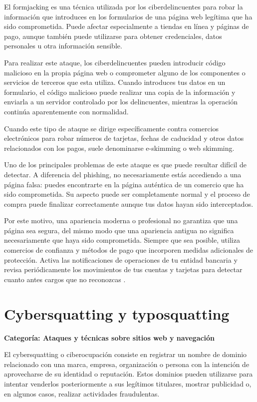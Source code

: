 \documentclass[
  spanish,
  a4paper,
  openany]{book}
\begin{document}
El formjacking es una técnica utilizada por los ciberdelincuentes para robar la información que introduces en los formularios de una página web legítima que ha sido comprometida. Puede afectar especialmente a tiendas en línea y páginas de pago, aunque también puede utilizarse para obtener credenciales, datos personales u otra información sensible.

Para realizar este ataque, los ciberdelincuentes pueden introducir código malicioso en la propia página web o comprometer alguno de los componentes o servicios de terceros que esta utiliza. Cuando introduces tus datos en un formulario, el código malicioso puede realizar una copia de la información y enviarla a un servidor controlado por los delincuentes, mientras la operación continúa aparentemente con normalidad.

Cuando este tipo de ataque se dirige específicamente contra comercios electrónicos para robar números de tarjetas, fechas de caducidad y otros datos relacionados con los pagos, suele denominarse e-skimming o web skimming.

Uno de los principales problemas de este ataque es que puede resultar difícil de detectar. A diferencia del phishing, no necesariamente estás accediendo a una página falsa: puedes encontrarte en la página auténtica de un comercio que ha sido comprometida. Su aspecto puede ser completamente normal y el proceso de compra puede finalizar correctamente aunque tus datos hayan sido interceptados.

Por este motivo, una apariencia moderna o profesional no garantiza que una página sea segura, del mismo modo que una apariencia antigua no significa necesariamente que haya sido comprometida. Siempre que sea posible, utiliza comercios de confianza y métodos de pago que incorporen medidas adicionales de protección. Activa las notificaciones de operaciones de tu entidad bancaria y revisa periódicamente los movimientos de tus cuentas y tarjetas para detectar cuanto antes cargos que no reconozcas \citep{RZ-formjacking}.

\section{Cybersquatting y typosquatting}\label{cybersquatting-y-typosquatting}

\textbf{Categoría: Ataques y técnicas sobre sitios web y navegación}

El cybersquatting o ciberocupación consiste en registrar un nombre de dominio relacionado con una marca, empresa, organización o persona con la intención de aprovecharse de su identidad o reputación. Estos dominios pueden utilizarse para intentar venderlos posteriormente a sus legítimos titulares, mostrar publicidad o, en algunos casos, realizar actividades fraudulentas.
\end{document}
